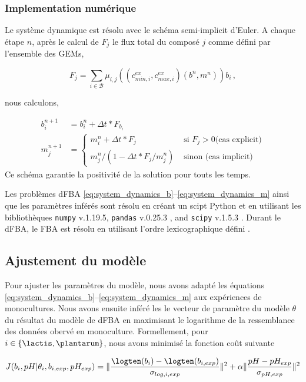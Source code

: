 \documentclass[../main.tex]{subfiles}
\begin{document}
\subsubsection{Implementation numérique} Le système dynamique est résolu avec le schéma semi-implicit d'Euler. A chaque étape $n$, après le calcul de $F_j$ le flux total du composé $j$ comme défini par l'ensemble des GEMs, 

\[ F_j=\sum_{i \in \mathcal{B}} {\mu}_{i,j}\left((c^{ex}_{min,i},c^{ex}_{max,i})(b^n,m^n)\right) b_i \,,\]

nous calculons,

\begin{align*}
b_i^{n+1}& = b_i^n+\Delta t* F_{b_i} \\
m_j^{n+1}& = \begin{cases} m_i^n+\Delta t* F_{j} & \text{ si } F_j>0 \text{(cas explicit)}\\
m_j^n/(1-\Delta t * F_j/m_j^n) & \text{ sinon (cas implicit)}
\end{cases}
\end{align*}
Ce schéma garantie la positivité de la solution pour touts les temps.

Les problèmes dFBA \eqref{eq:system_dynamics_b}--\eqref{eq:system_dynamics_m} ainsi que les paramètres inférés sont résolu en créant un scipt Python et en utilisant les bibliothèques \texttt{numpy} v.1.19.5\citep{harris2020array}, \texttt{pandas} v.0.25.3 \citep{mckinney2010data}, and \texttt{scipy} v.1.5.3 \citep{mckinney-proc-scipy-2010}. Durant le dFBA, le FBA est résolu en utilisant l'ordre lexicographique défini \citep{Gomez2018}.

\subsection{Ajustement du modèle}

Pour ajuster les paramètres du modèle, nous avons adapté les équations \eqref{eq:system_dynamics_b}--\eqref{eq:system_dynamics_m} aux expériences de monocultures. Nous avons ensuite inféré les le vecteur de paramètre du modèle $\theta$ du résultat du modèle de dFBA en maximisant le logarithme de la ressemblance des données obervé en monoculture. Formellement, pour $i \in \{ \lactis,\plantarum \}$, nous avons minimisé la fonction coût suivante 

\begin{equation}
J(b_i,pH | \theta_i, b_{i,exp},pH_{exp} ) = \| \frac{\logten(b_i) - \logten(b_{i,exp})}{\sigma_{log,i,exp}} \|^2 + \alpha \|\frac{pH - pH_{exp}}{\sigma_{pH,exp}} \|^2 
\label{eq:optim_LAB}
\end{equation}
\end{document}
